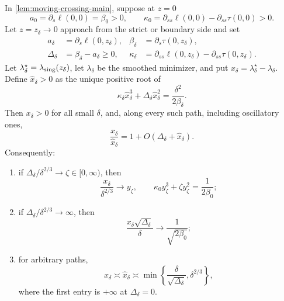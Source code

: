 \begin{theorem}
\label{thm:crossover-main}
In \cref{lem:moving-crossing-main}, suppose at \(z=0\)
\begin{equation}
 a_0=\partial_s\ell(0,0)=\beta_0>0,
 \qquad
 \kappa_0=\partial_{ss}\ell(0,0)-\partial_{ss}\tau(0,0)>0.
 \label{eq:crossover-boundary-data-main}
\end{equation}
Let \(z=z_\delta\to0\) approach from the strict or boundary side and set
\begin{align*}
 a_\delta&=\partial_s\ell(0,z_\delta),
 &\beta_\delta&=\partial_s\tau(0,z_\delta),\\
 \Delta_\delta&=\beta_\delta-a_\delta\ge0,
 &\kappa_\delta&=\partial_{ss}\ell(0,z_\delta)
                    -\partial_{ss}\tau(0,z_\delta).
\end{align*}
Let \(\lambda_\delta^\star=\lambda_{\rm sing}(z_\delta)\), let
\(\lambda_\delta\) be the smoothed minimizer, and put
\(x_\delta=\lambda_\delta^\star-\lambda_\delta\).  Define
\(\widehat x_\delta>0\) as the unique positive root of
\begin{equation}
 \kappa_\delta\widehat x_\delta^3
 +\Delta_\delta\widehat x_\delta^2
 =\frac{\delta^2}{2\beta_\delta}.
 \label{eq:cubic-root-main}
\end{equation}
Then \(x_\delta>0\) for all small \(\delta\), and, along every such path,
including oscillatory ones,
\begin{equation}
 \frac{x_\delta}{\widehat x_\delta}
 =1+O(\Delta_\delta+\widehat x_\delta).
 \label{eq:cubic-relative-main}
\end{equation}
Consequently:
\begin{enumerate}
 \item if \(\Delta_\delta/\delta^{2/3}\to\zeta\in[0,\infty)\), then
 \begin{equation}
  \frac{x_\delta}{\delta^{2/3}}\to y_\zeta,
  \qquad
  \kappa_0y_\zeta^3+\zeta y_\zeta^2=\frac{1}{2\beta_0};
  \label{eq:crossover-critical-main}
 \end{equation}
 \item if \(\Delta_\delta/\delta^{2/3}\to\infty\), then
 \begin{equation}
  \frac{x_\delta\sqrt{\Delta_\delta}}{\delta}
  \to\frac{1}{\sqrt{2\beta_0}};
  \label{eq:crossover-inner-main}
 \end{equation}
 \item for arbitrary paths,
 \begin{equation}
  x_\delta\asymp\widehat x_\delta\asymp
  \min\left\{\frac{\delta}{\sqrt{\Delta_\delta}},
              \delta^{2/3}\right\},
  \label{eq:crossover-scale-main}
 \end{equation}
 where the first entry is \(+\infty\) at \(\Delta_\delta=0\).
\end{enumerate}
\end{theorem}

